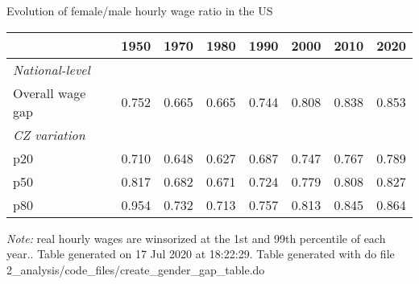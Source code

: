\begin{center}
\begin{threeparttable}[!h]
\caption{Evolution of female/male hourly wage ratio in the US}
\begin{tabular}{lccccccc}
\toprule
\toprule
\textbf{}&\multicolumn{1}{c}{\textbf{1950}}&\multicolumn{1}{c}{\textbf{1970}}&\multicolumn{1}{c}{\textbf{1980}}&\multicolumn{1}{c}{\textbf{1990}}&\multicolumn{1}{c}{\textbf{2000}}&\multicolumn{1}{c}{\textbf{2010}}&\multicolumn{1}{c}{\textbf{2020}} \\
\midrule
\textit{National-level} \\
\hspace{3mm}Overall wage gap&       0.752&       0.665&       0.665&       0.744&       0.808&       0.838&       0.853\\
\textit{CZ variation} \\
\hspace{3mm}p20     &       0.710&       0.648&       0.627&       0.687&       0.747&       0.767&       0.789\\
\hspace{3mm}p50     &       0.817&       0.682&       0.671&       0.724&       0.779&       0.808&       0.827\\
\hspace{3mm}p80     &       0.954&       0.732&       0.713&       0.757&       0.813&       0.845&       0.864\\
\bottomrule
\bottomrule
\end{tabular}
\begin{tablenotes}
\item \footnotesize \textit{Note:} real hourly wages are winsorized at the 1st and 99th percentile of each year.. Table generated on 17 Jul 2020 at 18:22:29. Table generated with do file 2\_analysis/code\_files/create\_gender\_gap\_table.do
\end{tablenotes}
\end{threeparttable}
\end{center}
